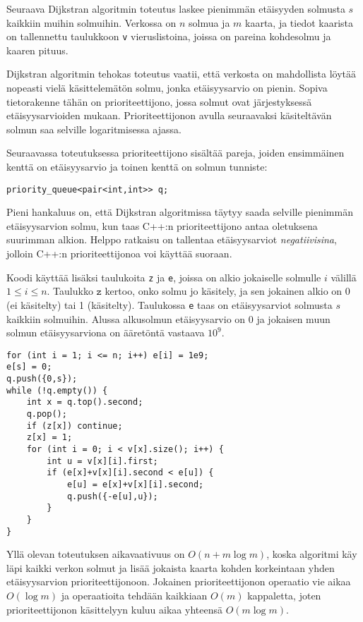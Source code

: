 Seuraava Dijkstran algoritmin toteutus laskee
pienimmän etäisyyden solmusta $s$ kaikkiin muihin solmuihin.
Verkossa on $n$ solmua ja $m$ kaarta,
ja tiedot kaarista on tallennettu taulukkoon \texttt{v}
vieruslistoina, joissa on pareina kohdesolmu
ja kaaren pituus.

Dijkstran algoritmin tehokas toteutus vaatii,
että verkosta on mahdollista
löytää nopeasti vielä käsittelemätön solmu,
jonka etäisyysarvio on pienin.
Sopiva tietorakenne tähän on prioriteettijono,
jossa solmut ovat järjestyksessä etäisyysarvioiden mukaan.
Prioriteettijonon avulla
seuraavaksi käsiteltävän solmun saa selville logaritmisessa ajassa.

Seuraavassa toteutuksessa prioriteettijono sisältää
pareja, joiden ensimmäinen kenttä on etäisyysarvio
ja toinen kenttä on solmun tunniste:
\begin{lstlisting}
priority_queue<pair<int,int>> q;
\end{lstlisting}
Pieni hankaluus on,
että Dijkstran algoritmissa täytyy saada selville
pienimmän etäisyysarvion solmu,
kun taas C++:n prioriteettijono antaa oletuksena
suurimman alkion.
Helppo ratkaisu on tallentaa etäisyysarviot
\textit{negatiivisina}, jolloin C++:n prioriteettijonoa
voi käyttää suoraan.

Koodi käyttää lisäksi taulukoita
\texttt{z} ja \texttt{e},
joissa on alkio jokaiselle solmulle $i$
välillä $1 \le i \le n$.
Taulukko $\texttt{z}$ kertoo,
onko solmu jo käsitely,
ja sen jokainen alkio on 0 (ei käsitelty)
tai 1 (käsitelty).
Taulukossa \texttt{e} taas on etäisyysarviot
solmusta $s$ kaikkiin solmuihin.
Alussa alkusolmun etäisyysarvio on 0
ja jokaisen muun solmun etäisyysarviona
on ääretöntä vastaava $10^9$.

\begin{lstlisting}
for (int i = 1; i <= n; i++) e[i] = 1e9;
e[s] = 0;
q.push({0,s});
while (!q.empty()) {
    int x = q.top().second;
    q.pop();
    if (z[x]) continue;
    z[x] = 1;
    for (int i = 0; i < v[x].size(); i++) {
        int u = v[x][i].first;
        if (e[x]+v[x][i].second < e[u]) {
            e[u] = e[x]+v[x][i].second;
            q.push({-e[u],u});
        }
    }
}
\end{lstlisting}

Yllä olevan toteutuksen aikavaativuus on $O(n+m \log m)$,
koska algoritmi käy läpi kaikki verkon solmut
ja lisää jokaista kaarta kohden korkeintaan
yhden etäisyysarvion prioriteettijonoon.
Jokainen prioriteettijonon operaatio vie aikaa
$O(\log m)$ ja operaatioita tehdään kaikkiaan
$O(m)$ kappaletta,
joten prioriteettijonon käsittelyyn
kuluu aikaa yhteensä $O(m \log m)$.

